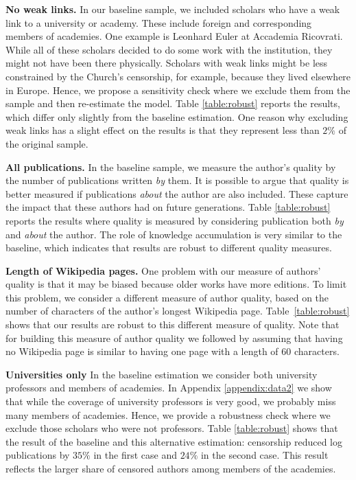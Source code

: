\textbf{No weak links.} In our baseline sample, we included scholars who have a weak link to a university or academy. These include foreign and corresponding members of academies. One example is Leonhard Euler at Accademia Ricovrati. While all of these scholars decided to do some work with the institution, they might not have been there physically. Scholars with weak links might be less constrained by the Church's censorship, for example, because they lived elsewhere in Europe. Hence, we propose a sensitivity check where we exclude them from the sample and then re-estimate the model. Table \ref{table:robust} reports the results, which differ only slightly from the baseline estimation. One reason why excluding weak links has a slight effect on the results is that they represent less than $2\%$ of the original sample.

\textbf{All publications.} In the baseline sample, we measure the author's quality by the number of publications written \textit{by} them. It is possible to argue that quality is better measured if publications \textit{about} the author are also included. These capture the impact that these authors had on future generations. Table \ref{table:robust} reports the results where quality is measured by considering publication both \textit{by} and \textit{about} the author. The role of knowledge accumulation is very similar to the baseline, which indicates that results are robust to different quality measures.

\textbf{Length of Wikipedia pages.} One problem with our measure of authors' quality is that it may be biased because older works have more editions. To limit this problem, we consider a different measure of author quality, based on the number of characters of the author's longest Wikipedia page. Table~\ref{table:robust} shows that our results are robust to this different measure of quality. Note that for building this measure of author quality we followed  by assuming that having no Wikipedia page is similar to having one page with a length of 60 characters.



\textbf{Universities only} In the baseline estimation we consider both university professors and members of academies. In Appendix \ref{appendix:data2} we show that while the coverage of university professors is very good, we probably miss many members of academies. Hence, we provide a robustness check where we exclude those scholars who were not professors. Table \ref{table:robust} shows that the result of the baseline and this alternative estimation: censorship reduced log publications by $35\%$ in the first case and $24\%$ in the second case. This result reflects the larger share of censored authors among members of the academies.

